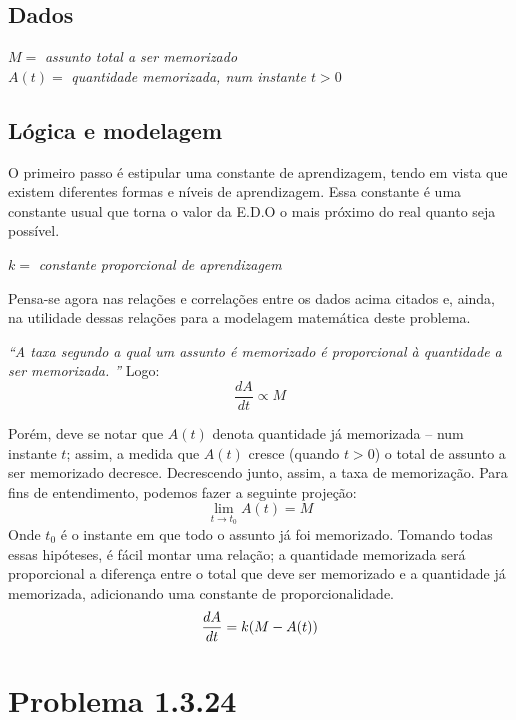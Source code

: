 \subsection{Dados}
\begin{center}
	\noindent $M= $\textit{ assunto total a ser memorizado\\}
	\noindent $A(t)=$\textit{ quantidade memorizada, num instante $t > 0$\\}
\end{center}
\subsection{Lógica e modelagem}
O primeiro passo é estipular uma constante de aprendizagem, tendo em vista que existem diferentes formas e níveis de aprendizagem. Essa constante é uma constante usual que torna o valor da E.D.O o mais próximo do real quanto seja possível.
\begin{center}
	\noindent $k= $\textit{ constante proporcional de aprendizagem\\}
\end{center}

Pensa-se agora nas relações e correlações entre os dados acima citados e, ainda, na utilidade dessas relações para a modelagem matemática deste problema.

\textit{“A taxa segundo a qual um assunto é memorizado é proporcional à quantidade a ser memorizada. ”}
Logo:
\begin{equation*}
\frac{dA}{dt} \propto M
\end{equation*}

Porém, deve se notar que $A(t)$ denota quantidade já memorizada – num instante $t$; assim, a medida que $A(t)$ cresce (quando $t>0$) o total de assunto a ser memorizado decresce. Decrescendo junto, assim, a taxa de memorização.
Para fins de entendimento, podemos fazer a seguinte projeção:
\[ \lim_{t \to t_{0}} A(t) = M \]
Onde $t_{0}$ é o instante em que todo o assunto já foi memorizado.
Tomando todas essas hipóteses, é fácil montar uma relação; a quantidade memorizada será proporcional a diferença entre o total que deve ser memorizado e a quantidade já memorizada, adicionando uma constante de proporcionalidade.
\begin{equation}\label{eqmemo}
\boldmath
	\frac{dA}{dt} = k(M-A(t))
\end{equation}

\section{Problema 1.3.24}
